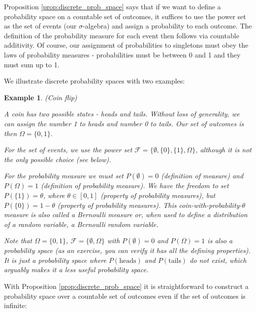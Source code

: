 \documentclass{book}
\theoremstyle{plain}%
\newtheorem{prototheorem}{Example}[section]
\newenvironment{cexample}
   {\colorlet{shadecolor}{gray!10}\begin{shaded}\begin{prototheorem}}
   {\end{prototheorem}\end{shaded}}
\theoremstyle{definition}
\begin{document}
Proposition \ref{prop:discrete_prob_space} says that if we want to define a probability space on a countable set of outcomes, it suffices to use the power set as the set of events (our $\sigma$-algebra) and assign a probability to each outcome. The definition of the probability measure for each event then follows via countable additivity. Of course, our assignment of probabilities to singletons must obey the laws of probability measures - probabilities must be between 0 and 1 and they must sum up to 1.

We illustrate discrete probability spaces with two examples:

\begin{cexample}{(Coin flip)}{}

A coin has two possible states - heads and tails. Without loss of generality, we can assign the number 1 to heads and number 0 to tails. Our set of outcomes is then $\Omega = \{0, 1\}$.
  
For the set of events, we use the power set $\mathcal{F} = \{\emptyset, \{0\}, \{1\}, \Omega\}$, although it is not the only possible choice (see below).
  
For the probability measure we must set $P(\emptyset) = 0$ (definition of measure) and $P(\Omega) = 1$ (definition of probability measure). We have the freedom to set $P(\{1\})= \theta$, where $\theta \in [0,1]$ (property of probability measures), but $P(\{0\}) = 1 - \theta$ (property of probability measures). This \emph{coin-with-probability-$\theta$} measure is also called a Bernoulli measure or, when used to define a distribution of a random variable, a Bernoulli random variable.
  
Note that $\Omega = \{0, 1\}$, $\mathcal{F} = \{\emptyset, \Omega\}$ with $P(\emptyset) = 0$ and $P(\Omega) = 1$ is also a probability space (as an exercise, you can verify it has all the defining properties). It is just a probability space where $P(\text{heads})$ and $P(\text{tails})$ do not exist, which arguably makes it a less useful probability space.
\end{cexample}

With Proposition \ref{prop:discrete_prob_space} it is straightforward to construct a probability space over a countable set of outcomes even if the set of outcomes is infinite:
\end{document}
